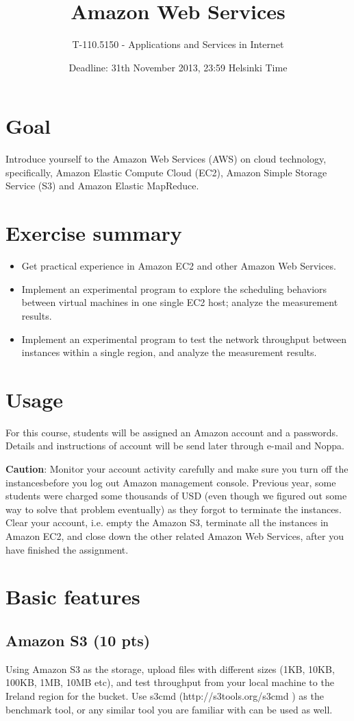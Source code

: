 \documentclass[12pt, a4paper]{article}
\title{Amazon Web Services}
\author{T-110.5150 - Applications and Services in Internet}
\date{Deadline: 31th November 2013, 23:59 Helsinki Time}
\begin{document}
\maketitle
\section{Goal}
Introduce yourself to the Amazon Web Services (AWS) on cloud technology, specifically, Amazon Elastic Compute Cloud (EC2), Amazon Simple Storage Service (S3) and Amazon Elastic MapReduce.
\section{Exercise summary}
\begin{itemize}
\item Get practical experience in Amazon EC2 and other Amazon Web Services.
\item Implement an experimental program to explore the scheduling behaviors between virtual machines in one single EC2 host; analyze the measurement results.
\item Implement an experimental program to test the network throughput between instances within a single region, and analyze the measurement results.
\end{itemize}
\section{Usage}
For this course, students will be assigned an Amazon account and a passwords. Details and instructions of account will be send later through e-mail and Noppa.

\textbf{Caution}: Monitor your account activity carefully and make sure you turn off the instancesbefore you log out Amazon management console. Previous year, some students were charged some thousands of USD (even though we figured out some way to solve that problem eventually) as they forgot to terminate the instances. Clear your account, i.e. empty the Amazon S3, terminate all the instances in Amazon EC2, and close down the other related Amazon Web Services, after you have finished the assignment.


\section{Basic features}
\subsection{Amazon S3 (10 pts)}
Using Amazon S3 as the storage, upload files with different sizes (1KB, 10KB, 100KB, 1MB, 10MB etc), and test throughput from your local machine to the Ireland region for the bucket. Use s3cmd (http://s3tools.org/s3cmd ) as the benchmark tool, or any similar tool you are familiar with can be used as well.
\end{document}
